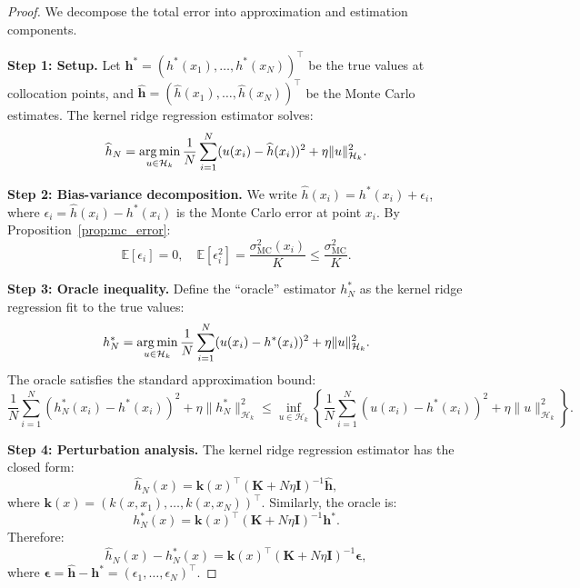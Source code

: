\documentclass[11pt,a4paper]{article}
\newcommand{\E}{\mathbb{E}}
\newcommand{\RKHS}{\mathcal{H}_k}
\newcommand{\bK}{\mathbf{K}}
\newcommand{\bI}{\mathbf{I}}
\newcommand{\argmin}{\operatornamewithlimits{arg\,min}}
\begin{document}
\begin{proof}
We decompose the total error into approximation and estimation components.

\textbf{Step 1: Setup.}
Let $\mathbf{h}^* = (h^*(x_1), \ldots, h^*(x_N))^\top$ be the true values at collocation points, and $\widehat{\mathbf{h}} = (\widehat{h}(x_1), \ldots, \widehat{h}(x_N))^\top$ be the Monte Carlo estimates. The kernel ridge regression estimator solves:
\begin{equation}
\widehat{h}_N = \argmin_{u \in \RKHS} \frac{1}{N}\sum_{i=1}^N (u(x_i) - \widehat{h}(x_i))^2 + \eta \|u\|_{\RKHS}^2.
\end{equation}

\textbf{Step 2: Bias-variance decomposition.}
We write $\widehat{h}(x_i) = h^*(x_i) + \epsilon_i$, where $\epsilon_i = \widehat{h}(x_i) - h^*(x_i)$ is the Monte Carlo error at point $x_i$. By Proposition~\ref{prop:mc_error}:
\begin{equation}
\E[\epsilon_i] = 0, \quad \E[\epsilon_i^2] = \frac{\sigma_{\mathrm{MC}}^2(x_i)}{K} \leq \frac{\sigma_{\mathrm{MC}}^2}{K}.
\end{equation}

\textbf{Step 3: Oracle inequality.}
Define the ``oracle'' estimator $h_N^*$ as the kernel ridge regression fit to the true values:
\begin{equation}
h_N^* = \argmin_{u \in \RKHS} \frac{1}{N}\sum_{i=1}^N (u(x_i) - h^*(x_i))^2 + \eta \|u\|_{\RKHS}^2.
\end{equation}
The oracle satisfies the standard approximation bound:
\begin{equation}
\frac{1}{N}\sum_{i=1}^N (h_N^*(x_i) - h^*(x_i))^2 + \eta\|h_N^*\|_{\RKHS}^2 \leq \inf_{u \in \RKHS}\left\{\frac{1}{N}\sum_{i=1}^N(u(x_i) - h^*(x_i))^2 + \eta\|u\|_{\RKHS}^2\right\}.
\end{equation}

\textbf{Step 4: Perturbation analysis.}
The kernel ridge regression estimator has the closed form:
\begin{equation}
\widehat{h}_N(x) = \mathbf{k}(x)^\top (\bK + N\eta \bI)^{-1} \widehat{\mathbf{h}},
\end{equation}
where $\mathbf{k}(x) = (k(x, x_1), \ldots, k(x, x_N))^\top$. Similarly, the oracle is:
\begin{equation}
h_N^*(x) = \mathbf{k}(x)^\top (\bK + N\eta \bI)^{-1} \mathbf{h}^*.
\end{equation}
Therefore:
\begin{equation}
\widehat{h}_N(x) - h_N^*(x) = \mathbf{k}(x)^\top (\bK + N\eta \bI)^{-1} \boldsymbol{\epsilon},
\end{equation}
where $\boldsymbol{\epsilon} = \widehat{\mathbf{h}} - \mathbf{h}^* = (\epsilon_1, \ldots, \epsilon_N)^\top$.


\end{proof}
\end{document}
